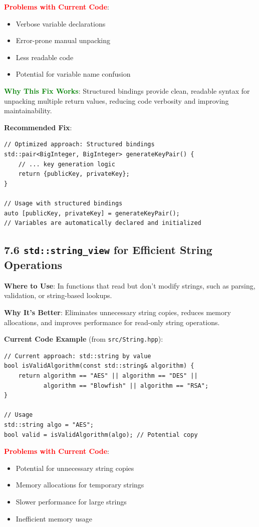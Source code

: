 \documentclass[11pt,a4paper]{article}
\begin{document}
\textcolor{red}{\textbf{Problems with Current Code}}:
\begin{itemize}
    \item Verbose variable declarations
    \item Error-prone manual unpacking
    \item Less readable code
    \item Potential for variable name confusion
\end{itemize}

\textcolor{green}{\textbf{Why This Fix Works}}: Structured bindings provide clean, readable syntax for unpacking multiple return values, reducing code verbosity and improving maintainability.

\textbf{Recommended Fix}:
\begin{lstlisting}
// Optimized approach: Structured bindings
std::pair<BigInteger, BigInteger> generateKeyPair() {
    // ... key generation logic
    return {publicKey, privateKey};
}

// Usage with structured bindings
auto [publicKey, privateKey] = generateKeyPair();
// Variables are automatically declared and initialized
\end{lstlisting}

\subsection{7.6 \texttt{std::string\_view} for Efficient String Operations}

\textbf{Where to Use}: In functions that read but don't modify strings, such as parsing, validation, or string-based lookups.

\textbf{Why It's Better}: Eliminates unnecessary string copies, reduces memory allocations, and improves performance for read-only string operations.

\textbf{Current Code Example} (from \texttt{src/String.hpp}):
\begin{lstlisting}
// Current approach: std::string by value
bool isValidAlgorithm(const std::string& algorithm) {
    return algorithm == "AES" || algorithm == "DES" || 
           algorithm == "Blowfish" || algorithm == "RSA";
}

// Usage
std::string algo = "AES";
bool valid = isValidAlgorithm(algo); // Potential copy
\end{lstlisting}

\textcolor{red}{\textbf{Problems with Current Code}}:
\begin{itemize}
    \item Potential for unnecessary string copies
    \item Memory allocations for temporary strings
    \item Slower performance for large strings
    \item Inefficient memory usage
\end{itemize}
\end{document}
